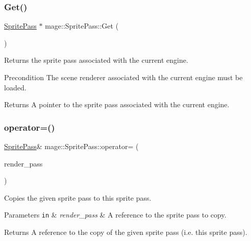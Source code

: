 \subsubsection{\texorpdfstring{Get()}{Get()}}
{\footnotesize\ttfamily \hyperlink{classmage_1_1_sprite_pass}{Sprite\+Pass} $\ast$ mage\+::\+Sprite\+Pass\+::\+Get (\begin{DoxyParamCaption}{ }\end{DoxyParamCaption})\hspace{0.3cm}{\ttfamily [static]}}

Returns the sprite pass associated with the current engine.

\begin{DoxyPrecond}{Precondition}
The scene renderer associated with the current engine must be loaded. 
\end{DoxyPrecond}
\begin{DoxyReturn}{Returns}
A pointer to the sprite pass associated with the current engine. 
\end{DoxyReturn}
\hypertarget{classmage_1_1_sprite_pass_afa43bb0a8588e9196180aa686d81cacc}{}\label{classmage_1_1_sprite_pass_afa43bb0a8588e9196180aa686d81cacc} 
\subsubsection{\texorpdfstring{operator=()}{operator=()}\hspace{0.1cm}{\footnotesize\ttfamily [1/2]}}
{\footnotesize\ttfamily \hyperlink{classmage_1_1_sprite_pass}{Sprite\+Pass}\& mage\+::\+Sprite\+Pass\+::operator= (\begin{DoxyParamCaption}\item[{const \hyperlink{classmage_1_1_sprite_pass}{Sprite\+Pass} \&}]{render\+\_\+pass }\end{DoxyParamCaption})\hspace{0.3cm}{\ttfamily [delete]}}

Copies the given sprite pass to this sprite pass.


\begin{DoxyParams}[1]{Parameters}
\mbox{\tt in}  & {\em render\+\_\+pass} & A reference to the sprite pass to copy. \\
\hline
\end{DoxyParams}
\begin{DoxyReturn}{Returns}
A reference to the copy of the given sprite pass (i.\+e. this sprite pass). 
\end{DoxyReturn}
\hypertarget{classmage_1_1_sprite_pass_aed8cc2bcb9ded1cb96c9d65bb7034c0a}{}\label{classmage_1_1_sprite_pass_aed8cc2bcb9ded1cb96c9d65bb7034c0a} 

